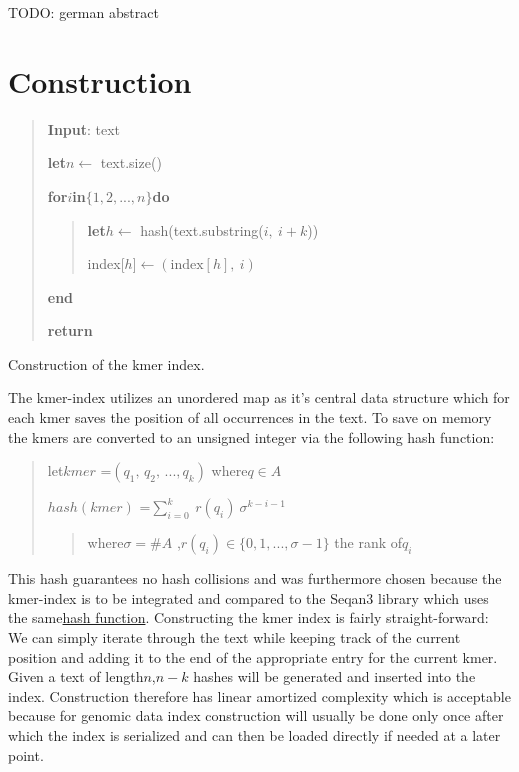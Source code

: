 \begin{abstractDE}
TODO: german abstract
\end{abstractDE}
\vfill

\tableofcontents{}
\setcounter{page}{1}





\chapter{Construction}

\begin{algorithm}[H]
\begin{verse}
\textbf{Input}: text

\textbf{let}$n$$\leftarrow$ text.size()

\textbf{for}$i$\textbf{in}$\{1,2,...,n\}$\textbf{do}
\begin{verse}
\textbf{let}$h$$\leftarrow$ hash(text.substring($i,\:i+k$))

index{[}$h${]}$\leftarrow$$(\text{index}[h],\:i)$
\end{verse}
\textbf{end}

\textbf{return}
\end{verse}
\caption{Construction of the kmer index.}
\end{algorithm}

The kmer-index utilizes an unordered map as it's central data structure
which for each kmer saves the position of all occurrences in the text.
To save on memory the kmers are converted to an unsigned integer via
the following hash function:
\begin{verse}
let$kmer$ =$(q_{1},\,q_{2},\,...,q_{k})$ where$q\in A$

$hash(kmer)$ =$\sum_{i=0}^{k}\:r(q_{i})\:\sigma^{k-i-1}$
\begin{verse}
where$\sigma=\#A$ ,$r(q_{i})\in\{0,1,...,\sigma-1\}$ the rank of$q_{i}$
\end{verse}
\end{verse}
This hash guarantees no hash collisions and was furthermore chosen
because the kmer-index is to be integrated and compared to the Seqan3
library which uses the same\href{http://docs.seqan.de/seqan/3-master-user/group__views.html\#ga6e598d6a021868f704d39df73252974f}{hash function}.
Constructing the kmer index is fairly straight-forward: We can simply
iterate through the text while keeping track of the current position
and adding it to the end of the appropriate entry for the current
kmer. Given a text of length$n$,$n-k$ hashes will be generated and
inserted into the index. Construction therefore has linear amortized
complexity which is acceptable because for genomic data index construction
will usually be done only once after which the index is serialized
and can then be loaded directly if needed at a later point.

